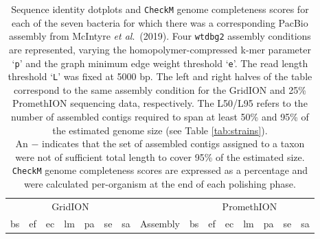 \documentclass[a4paper,num-refs]{oup-contemporary}
\begin{document}
\setlength{\tabcolsep}{0.5pt}
\begin{table}[t!]
\caption{Sequence identity dotplots and \texttt{CheckM} genome completeness scores for each of the seven bacteria for which there was a corresponding PacBio assembly from McIntyre \textit{et al}.\ (2019). Four \texttt{wtdbg2} assembly conditions are represented, varying the homopolymer-compressed k-mer parameter `\texttt{p}' and the graph minimum edge weight threshold `\texttt{e}'. The read length threshold `\texttt{L}' was fixed at 5000 bp. The left and right halves of the table correspond to the same assembly condition for the GridION and 25\% PromethION sequencing data, respectively. The L50/L95 refers to the number of assembled contigs required to span at least 50\% and 95\% of the estimated genome size (see Table \ref{tab:strains}).\\An $-$ indicates that the set of assembled contigs assigned to a taxon were not of sufficient total length to cover 95\% of the estimated size. \texttt{CheckM} genome completeness scores are expressed as a percentage and were calculated per-organism at the end of each polishing phase.}
\label{tab:dotplot}
\begin{tabular}{ccccccc|cc|ccccccc}
                   \multicolumn{7}{c}{GridION} & \multicolumn{2}{c}{} & \multicolumn{7}{c}{PromethION} \\
bs      &       ef      &       ec      &       lm      &       pa      &       se      &       sa      &       \multicolumn{2}{c|}{Assembly}   &       bs      &       ef      &       ec      &       lm      &       pa      &       se      &       sa\\
\toprule

\end{tabular}
\end{table}
\end{document}
